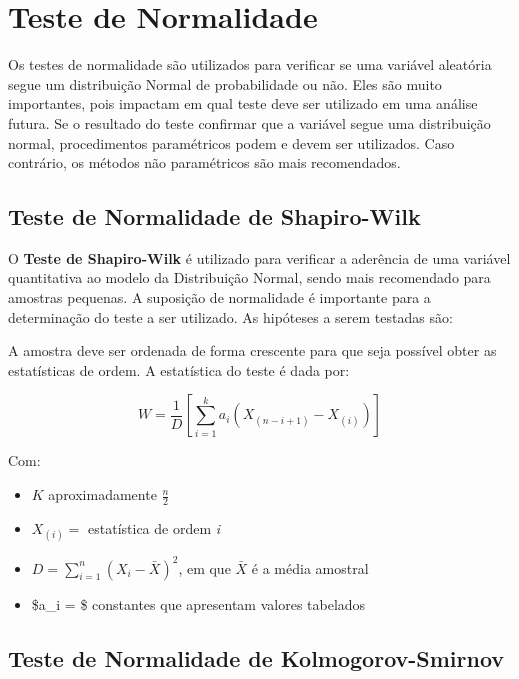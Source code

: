 \documentclass[
  portuguese,
]{estat/estat}
\let\oldsection\section
\renewcommand\section{\clearpage\oldsection}
\begin{document}
\section{Teste de Normalidade}\label{teste-de-normalidade}

Os testes de normalidade são utilizados para verificar se uma variável
aleatória segue um distribuição Normal de probabilidade ou não. Eles são
muito importantes, pois impactam em qual teste deve ser utilizado em uma
análise futura. Se o resultado do teste confirmar que a variável segue
uma distribuição normal, procedimentos paramétricos podem e devem ser
utilizados. Caso contrário, os métodos não paramétricos são mais
recomendados.

\subsection{Teste de Normalidade de
Shapiro-Wilk}\label{teste-de-normalidade-de-shapiro-wilk}

O \textbf{Teste de Shapiro-Wilk} é utilizado para verificar a aderência
de uma variável quantitativa ao modelo da Distribuição Normal, sendo
mais recomendado para amostras pequenas. A suposição de normalidade é
importante para a determinação do teste a ser utilizado. As hipóteses a
serem testadas são:


A amostra deve ser ordenada de forma crescente para que seja possível
obter as estatísticas de ordem. A estatística do teste é dada por:

\[ W = \frac{1}{D} \left[ \sum_{i=1}^{k} a_{i} \left(X_{(n-i+1)} - X_{(i)}\right) \right] \]

Com:

\begin{itemize}
\item
  \(K\) aproximadamente \(\displaystyle\frac{n}{2}\)
\item
  \(X_{\left(i\right)} =\) estatística de ordem \emph{i}
\item
  \(D = \displaystyle \sum_{i=1}^{n}(X_{i} - \bar{X})^2\), em que
  \(\bar{X}\) é a média amostral
\item
  \$a\_i = \$ constantes que apresentam valores tabelados
\end{itemize}

\subsection{Teste de Normalidade de
Kolmogorov-Smirnov}\label{teste-de-normalidade-de-kolmogorov-smirnov}
\end{document}

